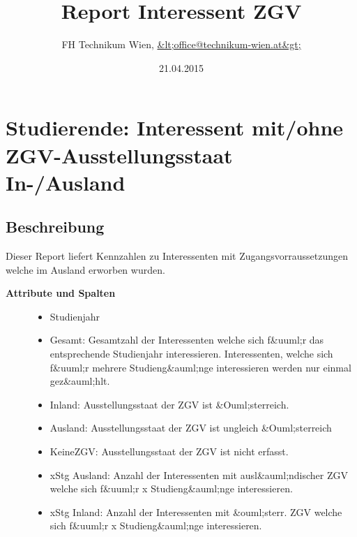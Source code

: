 \documentclass [a4paper,abstracton,titlepage]{scrartcl}
\title{Report Interessent ZGV}
\author{FH Technikum Wien, \href{mailto:&lt;office@technikum-wien.at&gt;}{&lt;office@technikum-wien.at&gt;}}
\date{21.04.2015}
\begin{document}

\label{header}\hypertarget{header}{}
\maketitle
\hypertarget{_studierende_interessent_mit_ohne_zgv_ausstellungsstaat_in_ausland}{}
\section{Studierende: Interessent mit/ohne ZGV-Ausstellungsstaat In-/Ausland}
\label{_studierende_interessent_mit_ohne_zgv_ausstellungsstaat_in_ausland}
\hypertarget{_beschreibung}{}
\subsection{Beschreibung}
\label{_beschreibung}
 \par\noindent{}Dieser Report liefert Kennzahlen zu Interessenten mit Zugangsvorraussetzungen welche im Ausland erworben wurden.
  \begin{description}
\item[%
\textbf{Attribute und Spalten}
]
  \begin{itemize}
\item%
Studienjahr

\item%
Gesamt: Gesamtzahl der Interessenten welche sich f\&{}uuml;r das entsprechende Studienjahr interessieren. Interessenten, welche sich f\&{}uuml;r mehrere Studieng\&{}auml;nge interessieren werden nur einmal gez\&{}auml;hlt.

\item%
Inland: Ausstellungsstaat der ZGV ist \&{}Ouml;sterreich.

\item%
Ausland: Ausstellungsstaat der ZGV ist ungleich \&{}Ouml;sterreich

\item%
KeineZGV: Ausstellungsstaat der ZGV ist nicht erfasst.

\item%
xStg Ausland: Anzahl der Interessenten mit ausl\&{}auml;ndischer ZGV welche sich f\&{}uuml;r x Studieng\&{}auml;nge interessieren.

\item%
xStg Inland: Anzahl der Interessenten mit \&{}ouml;sterr. ZGV welche sich f\&{}uuml;r x Studieng\&{}auml;nge interessieren.

\end{itemize}
\end{description}
\hypertarget{_inhalt}{}
\end{document}
